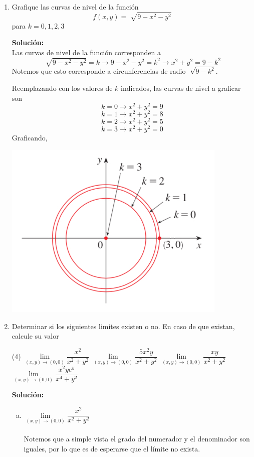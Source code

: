 \documentclass[12pt]{article}
\newenvironment{solucion}
{\begin{mdframed}[backgroundcolor=black!10]
		{\bf Solución:}\\
	}
	{
	\end{mdframed}
}
\newenvironment{preguntas}
{\begin{enumerate}\itemsep12pt
	}
	{
	\end{enumerate}
}
\newcommand{\ra}{\rightarrow}
\begin{document}
\begin{preguntas}
\item Grafique las curvas de nivel de la función 
	$$ f(x,y) = \sqrt[]{9-x^2-y^2}$$
	para $k=0,1,2,3$
\begin{solucion}

		Las curvas de nivel de la función corresponden a
		$$\sqrt[]{9-x^2-y^2} = k \ra 9-x^2-y^2 = k^2 \ra x^2+y^2 = 9-k^2$$
		Notemos que esto corresponde a circunferencias de radio $\sqrt[]{9-k^2}$.
		
		Reemplazando con los valores de $k$ indicados, las curvas de nivel a graficar son
		$$k = 0 \ra x^2+y^2 = 9$$
		$$k = 1 \ra x^2+y^2 = 8$$
		$$k = 2 \ra x^2+y^2 = 5$$
		$$k = 3 \ra x^2+y^2 = 0$$
		Graficando,
		
		\begin{center}
			\includegraphics[scale=0.4]{../../../../img/curvasdenivel}			
		\end{center}
\end{solucion}
\item Determinar si los siguientes limites existen o no. En caso de que existan, calcule su valor
\begin{tasks}(4)
\task $\lim\limits_{(x,y) \to (0,0)} \dfrac{x^2}{x^2+y^2}$
\task $\lim\limits_{(x,y) \to (0,0)} \dfrac{5x^2y}{x^2+y^2}$
\task $\lim\limits_{(x,y) \to (0,0)} \dfrac{xy}{x^2+y^2}$
\task $\lim\limits_{(x,y) \to (0,0)} \dfrac{x^2ye^y}{x^4+y^2}$
\end{tasks}
\begin{solucion}

\begin{enumerate}[a)]
\item $\lim\limits_{(x,y) \to (0,0)} \dfrac{x^2}{x^2+y^2}$\\
			\\
			Notemos que a simple vista el grado del numerador y el denominador son iguales, por lo que es de esperarse que el límite no exista.
			

\end{enumerate}
\end{solucion}
\end{preguntas}
\end{document}
